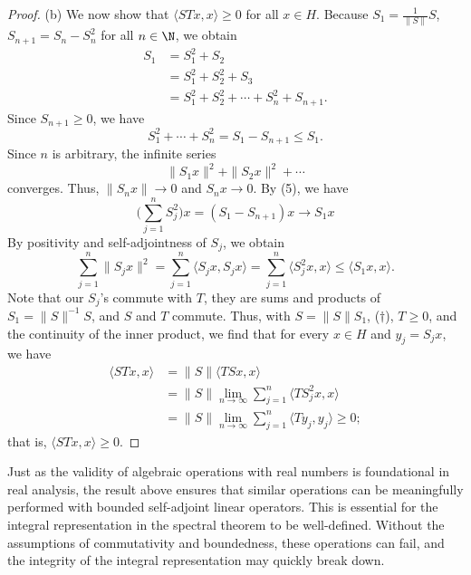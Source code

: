 \begin{proof}
(b) We now show that \( \langle ST x  , x  \rangle \geq 0  \) for all \( x \in H  \). Because \( {S}_{1} = \frac{ 1 }{ \|S\| } S  \), \( {S}_{n+1} = {S}_{n} - {S}_{n}^{2} \) for all \( n \in \N \), we obtain
\begin{align*}
    {S}_{1} &= {S}_{1}^{2} + {S}_{2} \\
            &= {S}_{1}^{2} + {S}_{2}^{2} + {S}_{3} \\
            &= {S}_{1}^{2} + {S}_{2}^{2} + \cdots  +{S}_{n}^{2} + {S}_{n+1}.
\end{align*}
Since \( {S}_{n+1} \geq  0 \), we have 
\[  {S}_{1}^{2} + \cdots + {S}_{n}^{2} = {S}_{1} - {S}_{n+1} \leq {S}_{1}. \]
Since \( n \) is arbitrary, the infinite series
\[  \|{S}_{1}x \|^{2} + \|{S}_{2}x\|^{2} + \cdots   \]
converges. Thus, \( \|{S}_{n}x \| \to 0  \) and \( {S}_{n}x  \to 0  \). By (5), we have 
\[  \Big(  \sum_{ j=1  }^{ n } {S}_{j}^{2} \Big) x = ({S}_{1} -{S}_{n+1})x \to {S}_{1}x  \tag{\( n \to \infty  \)}\]
By positivity and self-adjointness of \( {S}_{j} \), we obtain
\[  \sum_{ j=1  }^{ n } \|{S}_{j} x \|^{2} = \sum_{ j=1 }^{ n } \langle {S}_{j} x  ,  {S}_{j}x  \rangle = \sum_{ j=1  }^{ n } \langle {S}_{j}^{2}x  , x  \rangle \leq \langle {S}_{1}x  , x  \rangle. \tag{\( \dagger \)} \]
Note that our \( {S}_{j} \)'s commute with \( T  \), they are sums and products of \( {S}_{1} = \|S\|^{-1} S  \), and \( S  \) and \( T  \) commute. Thus, with \( S = \|S\| {S}_{1} \), (\( \dagger \)), \( T \geq 0  \), and the continuity of the inner product, we find that for every \( x \in H  \) and \( {y}_{j} = {S}_{j} x  \), we have 
\begin{align*}
    \langle ST x  ,  x  \rangle &= \|S \| \langle TS x  ,  x  \rangle \\
                                &= \|S\| \lim_{ n \to \infty  }  \sum_{ j=1  }^{ n } \langle T {S}_{j}^{2} x  ,  x  \rangle \\
                                &= \|S \| \lim_{ n \to \infty  }  \sum_{ j=1  }^{ n } \langle T {y}_{j} ,  {y}_{j} \rangle \geq 0;
\end{align*}
that is, \( \langle ST x  ,  x  \rangle \geq 0  \).
\end{proof}
Just as the validity of algebraic operations with real numbers is foundational in real analysis, the result above ensures that similar operations can be meaningfully performed with bounded self-adjoint linear operators. This is essential for the integral representation in the spectral theorem to be well-defined. Without the assumptions of commutativity and boundedness, these operations can fail, and the integrity of the integral representation may quickly break down.

